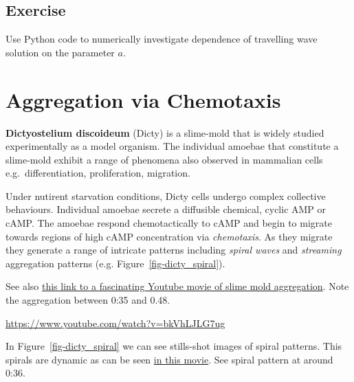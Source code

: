 \documentclass[
  letterpaper,
  DIV=11,
  numbers=noendperiod]{scrreprt}
\theoremstyle{plain}
\theoremstyle{definition}
\theoremstyle{plain}
\theoremstyle{remark}
\begin{document}
\hypertarget{exercise}{%
\section{Exercise}\label{exercise}}

Use Python code to numerically investigate dependence of travelling wave
solution on the parameter \(a\).

\hypertarget{aggregation-via-chemotaxis}{%
\chapter{Aggregation via Chemotaxis}\label{aggregation-via-chemotaxis}}

\textbf{Dictyostelium discoideum} (Dicty) is a slime-mold that is widely
studied experimentally as a model organism. The individual amoebae that
constitute a slime-mold exhibit a range of phenomena also observed in
mammalian cells e.g.~differentiation, proliferation, migration.

Under nutirent starvation conditions, Dicty cells undergo complex
collective behaviours. Individual amoebae secrete a diffusible chemical,
cyclic AMP or cAMP. The amoebae respond chemotactically to cAMP and
begin to migrate towards regions of high cAMP concentration via
\emph{chemotaxis}. As they migrate they generate a range of intricate
patterns including \emph{spiral waves} and \emph{streaming} aggregation
patterns (e.g. Figure~\ref{fig-dicty_spiral}).

See also \href{https://www.youtube.com/watch?v=bkVhLJLG7ug}{this link to
a fascinating Youtube movie of slime mold aggregation}. Note the
aggregation between 0:35 and 0.48.

\url{https://www.youtube.com/watch?v=bkVhLJLG7ug}

In Figure~\ref{fig-dicty_spiral} we can see stills-shot images of spiral
patterns. This spirals are dynamic as can be seen
\href{https://www.youtube.com/watch?v=OX5Yiz38fgY}{in this movie}. See
spiral pattern at around 0:36.
\end{document}
